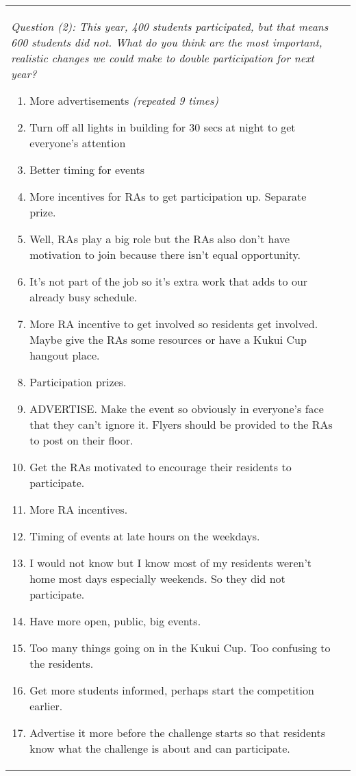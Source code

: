 \documentclass[]{article}
\begin{document}
\begin{figure*}[th!]
\begin{tabular}{|l|l|}
\hline

\small  \begin{minipage}[t]{3.75in}
{\em Question (2): This year, 400 students participated, but that means 600 students did not.  What do you think are the 
most important, realistic changes we could make to double participation for next year? }
\begin{enumerate}
\item More advertisements {\em (repeated 9 times)}
\item Turn off all lights in building for 30 secs at night to get everyone's attention
\item Better timing for events
\item More incentives for RAs to get participation up.  Separate prize.
\item Well, RAs play a big role but the RAs also don't have motivation to join because there isn't equal opportunity. 
\item It's not part of the job so it's extra work that adds to our already busy schedule.
\item More RA incentive to get involved so residents get involved.   Maybe give the RAs some resources or have a Kukui Cup hangout place. 
\item Participation prizes.
\item ADVERTISE.  Make the event so obviously in everyone's face that they can't ignore
  it. Flyers should be  provided to the RAs to post on their floor.
\item Get the RAs motivated to encourage their residents to participate.
\item More RA incentives. 
\item Timing of events at late hours on the weekdays.
\item I would not know but I know most of my residents weren't home most days especially weekends.  So they did not participate.
\item Have more open, public, big events.
\item Too many things going on in the Kukui Cup.   Too confusing to the residents. 
\item Get more students informed, perhaps start the competition earlier.
\item Advertise it more before the challenge starts so that residents know what the challenge is about and can participate.

\end{enumerate}
\end{minipage}
\end{tabular}
\end{figure*}
\end{document}
